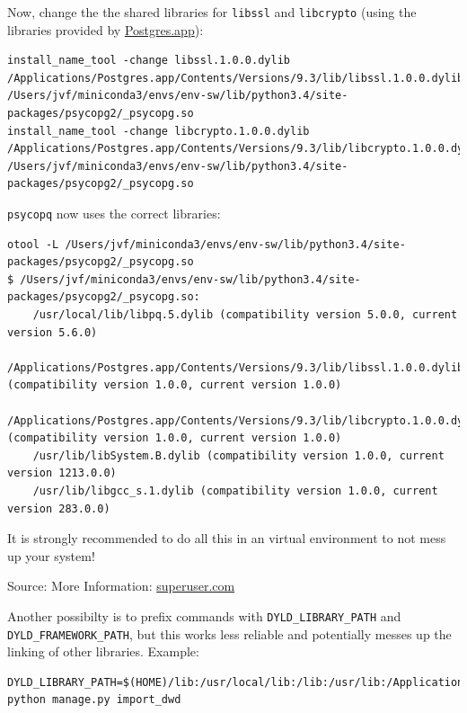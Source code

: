 \documentclass[paper=a4, fontsize=11pt]{scrartcl} %
\numberwithin{equation}{section} %
\numberwithin{figure}{section} %
\numberwithin{table}{section} %
\begin{document}
Now, change the the shared libraries for \texttt{libssl} and
\texttt{libcrypto} (using the libraries provided by
\href{http://postgresapp.com}{Postgres.app}):

\begin{lstlisting}[breaklines=true]
install_name_tool -change libssl.1.0.0.dylib /Applications/Postgres.app/Contents/Versions/9.3/lib/libssl.1.0.0.dylib /Users/jvf/miniconda3/envs/env-sw/lib/python3.4/site-packages/psycopg2/_psycopg.so
install_name_tool -change libcrypto.1.0.0.dylib /Applications/Postgres.app/Contents/Versions/9.3/lib/libcrypto.1.0.0.dylib /Users/jvf/miniconda3/envs/env-sw/lib/python3.4/site-packages/psycopg2/_psycopg.so
\end{lstlisting}

\texttt{psycopq} now uses the correct libraries:

\begin{lstlisting}[breaklines=true]
otool -L /Users/jvf/miniconda3/envs/env-sw/lib/python3.4/site-packages/psycopg2/_psycopg.so                                                                                                                                                   
$ /Users/jvf/miniconda3/envs/env-sw/lib/python3.4/site-packages/psycopg2/_psycopg.so:
    /usr/local/lib/libpq.5.dylib (compatibility version 5.0.0, current version 5.6.0)
    /Applications/Postgres.app/Contents/Versions/9.3/lib/libssl.1.0.0.dylib (compatibility version 1.0.0, current version 1.0.0)
    /Applications/Postgres.app/Contents/Versions/9.3/lib/libcrypto.1.0.0.dylib (compatibility version 1.0.0, current version 1.0.0)
    /usr/lib/libSystem.B.dylib (compatibility version 1.0.0, current version 1213.0.0)
    /usr/lib/libgcc_s.1.dylib (compatibility version 1.0.0, current version 283.0.0)
\end{lstlisting}

It is strongly recommended to do all this in an virtual environment to
not mess up your system!

Source: More Information:
\href{http://superuser.com/a/721564}{superuser.com}

Another possibilty is to prefix commands with
\texttt{DYLD\_LIBRARY\_PATH} and \texttt{DYLD\_FRAMEWORK\_PATH}, but
this works less reliable and potentially messes up the linking of other
libraries. Example:

\begin{lstlisting}[breaklines=true]
DYLD_LIBRARY_PATH=$(HOME)/lib:/usr/local/lib:/lib:/usr/lib:/Applications/Postgres.app/Contents/Versions/9.3/lib,DYLD_FRAMEWORK_PATH=/Library/Frameworks:/Network/Library/Frameworks:/System/Library/Frameworks python manage.py import_dwd
\end{lstlisting}
\end{document}

